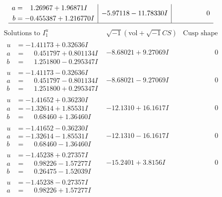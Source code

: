 \documentclass[1p]{elsarticle_modified}
\theoremstyle{definition}
\newcommand{\I}{\sqrt{-1}}
\begin{document}
$$\begin{array}{c|c|c}
\begin{aligned}
a &= \phantom{-}1.26967 + 1.96871 I \\
b &= -0.455387 + 1.216770 I\end{aligned}
 & -5.97118 - 11.78330 I & \phantom{-0.000000 } 0\\
 \hline 
 \end{array}$$\newpage$$\begin{array}{c|c|c}  
\text{Solutions to }I^u_{1}& \I (\text{vol} + \sqrt{-1}CS) & \text{Cusp shape}\\
 \hline 
\begin{aligned}
u &= -1.41173 + 0.32636 I \\
a &= \phantom{-}0.451797 + 0.801134 I \\
b &= \phantom{-}1.251800 - 0.295347 I\end{aligned}
 & -8.68021 + 9.27069 I & \phantom{-0.000000 } 0 \\ \hline\begin{aligned}
u &= -1.41173 - 0.32636 I \\
a &= \phantom{-}0.451797 - 0.801134 I \\
b &= \phantom{-}1.251800 + 0.295347 I\end{aligned}
 & -8.68021 - 9.27069 I & \phantom{-0.000000 } 0 \\ \hline\begin{aligned}
u &= -1.41652 + 0.36230 I \\
a &= -1.32614 + 1.85531 I \\
b &= \phantom{-}0.68460 + 1.36460 I\end{aligned}
 & -12.1310 + 16.1617 I & \phantom{-0.000000 } 0 \\ \hline\begin{aligned}
u &= -1.41652 - 0.36230 I \\
a &= -1.32614 - 1.85531 I \\
b &= \phantom{-}0.68460 - 1.36460 I\end{aligned}
 & -12.1310 - 16.1617 I & \phantom{-0.000000 } 0 \\ \hline\begin{aligned}
u &= -1.45238 + 0.27357 I \\
a &= \phantom{-}0.98226 - 1.57277 I \\
b &= \phantom{-}0.26475 - 1.52039 I\end{aligned}
 & -15.2401 + 3.8156 I & \phantom{-0.000000 } 0 \\ \hline\begin{aligned}
u &= -1.45238 - 0.27357 I \\
a &= \phantom{-}0.98226 + 1.57277 I \\

\end{aligned}
\end{array}$$
\end{document}
